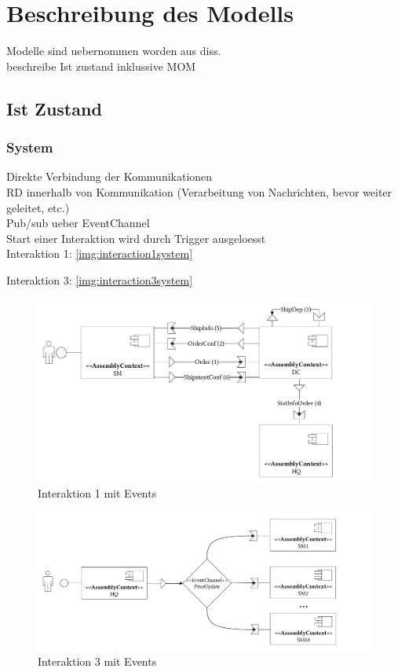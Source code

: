\section{Beschreibung des Modells}
Modelle sind uebernommen worden aus diss. \\
beschreibe Ist zustand inklussive MOM
\subsection{Ist Zustand}
\subsubsection{System}
Direkte Verbindung der Kommunikationen \\
RD innerhalb von Kommunikation (Verarbeitung von Nachrichten, bevor weiter geleitet, etc.)\\
Pub/sub ueber EventChannel \\
Start einer Interaktion wird durch Trigger ausgeloesst \\
Interaktion 1: \autoref{img:interaction1system}

Interaktion 3: \autoref{img:interaction3system}

\begin{figure}
\center
  \includegraphics[width=1\textwidth]{images/evaluation/specjms/evaluationInteraktion1events.pdf}
  \caption{Interaktion 1 mit Events}
  \label{img:interaction1system}
\end{figure}

\begin{figure}
\center
  \includegraphics[width=1\textwidth]{images/evaluation/specjms/evaluationInteraktion3events.pdf}
  \caption{Interaktion 3 mit Events}
  \label{img:interaction3system}
\end{figure}
